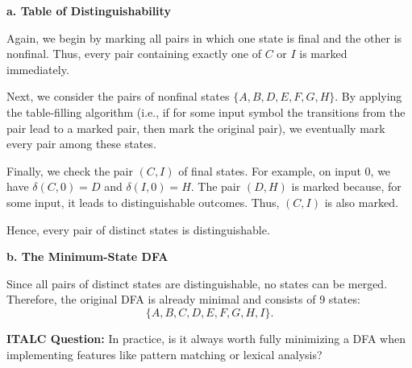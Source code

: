 \documentclass{article}
\theoremstyle{theorem}
\theoremstyle{definition}
\theoremstyle{remark}
\begin{document}
\textbf{a. Table of Distinguishability}

Again, we begin by marking all pairs in which one state is final and the other is nonfinal. Thus, every pair containing exactly one of \(C\) or \(I\) is marked immediately.

Next, we consider the pairs of nonfinal states \(\{A, B, D, E, F, G, H\}\). By applying the table-filling algorithm (i.e., if for some input symbol the transitions from the pair lead to a marked pair, then mark the original pair), we eventually mark every pair among these states.

Finally, we check the pair \((C,I)\) of final states. For example, on input 0, we have \(\delta(C,0)=D\) and \(\delta(I,0)=H\). The pair \((D,H)\) is marked because, for some input, it leads to distinguishable outcomes. Thus, \((C,I)\) is also marked.

Hence, every pair of distinct states is distinguishable.

\textbf{b. The Minimum-State DFA}

Since all pairs of distinct states are distinguishable, no states can be merged. Therefore, the original DFA is already minimal and consists of 9 states:
\[
\{A, B, C, D, E, F, G, H, I\}.
\]

\textbf{ITALC Question:}
In practice, is it always worth fully minimizing a DFA when implementing features like pattern matching or lexical analysis?
\end{document}
